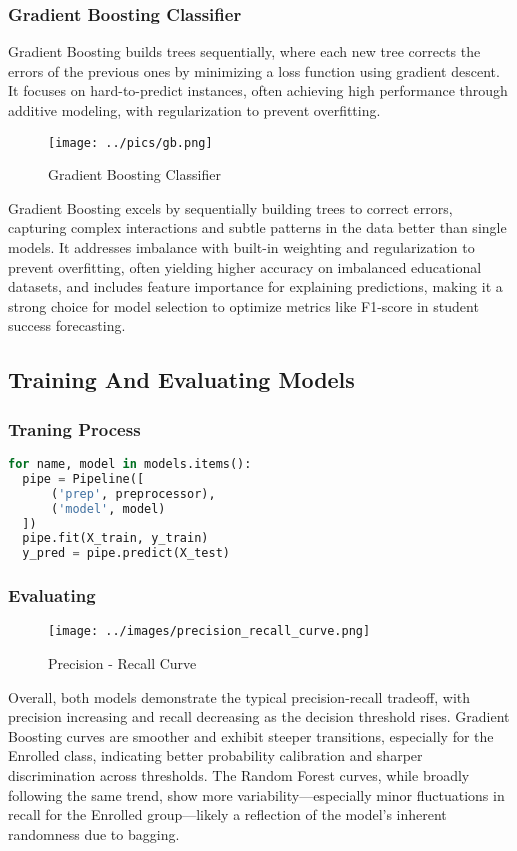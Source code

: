 \documentclass[twoside,final]{hcmut-report}
\begin{document}
\subsubsection*{Gradient Boosting Classifier}
Gradient Boosting builds trees sequentially, where each new tree corrects the errors of the previous ones by minimizing a loss function using gradient descent. It focuses on hard-to-predict instances, often achieving high performance through additive modeling, with regularization to prevent overfitting.
\begin{figure}[H]
  \centering
  \texttt{[image: ../pics/gb.png]}
  \caption{Gradient Boosting Classifier}
  \label{gb_clf}
\end{figure}
Gradient Boosting excels by sequentially building trees to correct errors, capturing complex interactions and subtle patterns in the data better than single models. It addresses imbalance with built-in weighting and regularization to prevent overfitting, often yielding higher accuracy on imbalanced educational datasets, and includes feature importance for explaining predictions, making it a strong choice for model selection to optimize metrics like F1-score in student success forecasting.
\subsection{Training And Evaluating Models}
\subsubsection*{Traning Process}
\begin{lstlisting}[language=python]
for name, model in models.items():
  pipe = Pipeline([
      ('prep', preprocessor),
      ('model', model)
  ])
  pipe.fit(X_train, y_train)
  y_pred = pipe.predict(X_test)
\end{lstlisting}
\subsubsection*{Evaluating}
\begin{figure}[H]
  \centering
  \texttt{[image: ../images/precision\_recall\_curve.png]}
  \caption{Precision - Recall Curve}
  \label{pr_curve}
\end{figure}
Overall, both models demonstrate the typical precision-recall tradeoff, with precision increasing and recall decreasing as the decision threshold rises. Gradient Boosting curves are smoother and exhibit steeper transitions, especially for the Enrolled class, indicating better probability calibration and sharper discrimination across thresholds. The Random Forest curves, while broadly following the same trend, show more variability—especially minor fluctuations in recall for the Enrolled group—likely a reflection of the model's inherent randomness due to bagging.\\
\end{document}

